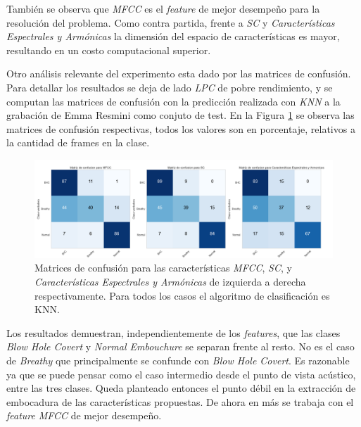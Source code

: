 \documentclass{article}
\begin{document}
También se observa que \textit{MFCC} es el \textit{feature} de mejor desempeño para la resolución del problema. Como contra partida, frente a \textit{SC} y \textit{Características Espectrales y Armónicas} la dimensión del espacio de características es mayor, resultando en un costo computacional superior. 
\medskip

Otro análisis relevante del experimento esta dado por las matrices de confusión. Para detallar los resultados se deja de lado \textit{LPC} de pobre rendimiento, y se computan las matrices de confusión con la predicción realizada con \textit{KNN} a la grabación de Emma Resmini como conjuto de test. En la Figura \ref{fig:exp1_confusion} se observa las matrices de confusión respectivas, todos los valores son en porcentaje, relativos a la cantidad de frames en la clase.

\begin{figure}[H]
\begin{center}
\includegraphics[width=1\textwidth]{exp1_confusion} 
\caption{Matrices de confusión para las características \textit{MFCC}, \textit{SC}, y \textit{Características Espectrales y Armónicas} de izquierda a derecha respectivamente. Para todos los casos el algoritmo de clasificación es KNN.}
\label{fig:exp1_confusion}
\end{center}
\end{figure}

Los resultados demuestran, independientemente de los \textit{features}, que las clases \textit{Blow Hole Covert} y \textit{Normal Embouchure} se separan frente al resto. No es el caso de \textit{Breathy} que principalmente se confunde con \textit{Blow Hole Covert}. Es razonable ya que se puede pensar como el caso intermedio desde el punto de vista acústico, entre las tres clases. Queda planteado entonces el punto débil en la extracción de embocadura de las características propuestas. De ahora en más se trabaja con el \textit{feature} \textit{MFCC} de mejor desempeño. 

\end{document}
